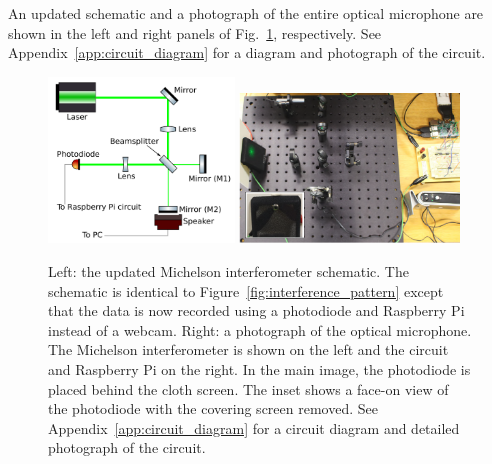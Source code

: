 \documentclass[paper-main.tex]{subfiles}
\begin{document}
An updated schematic and a photograph of the entire optical microphone are shown in the left and right panels of Fig.~\ref{fig:ifo_schematic_podo}, respectively.
See Appendix~\ref{app:circuit_diagram} for a diagram and photograph of the circuit. 


\begin{figure}
	\includegraphics[width=0.44\textwidth]{figures/ifo_schematic_photodiode_edit.pdf}
	\includegraphics[width=0.52\textwidth]{figures/setup_pic2.pdf}
	\caption{
Left: the updated Michelson interferometer schematic. 
The schematic is identical to Figure~\ref{fig:interference_pattern} except that the data is now recorded using a photodiode and Raspberry Pi instead of a webcam. 
Right: a photograph of the optical microphone. 
The Michelson interferometer is shown on the left and the circuit and Raspberry Pi on the right. 
In the main image, the photodiode is placed behind the cloth screen. 
The inset shows a face-on view of the photodiode with the covering screen removed. 
See Appendix~\ref{app:circuit_diagram} for a circuit diagram and detailed photograph of the circuit.
}
	\label{fig:ifo_schematic_podo}
\end{figure}
\end{document}
